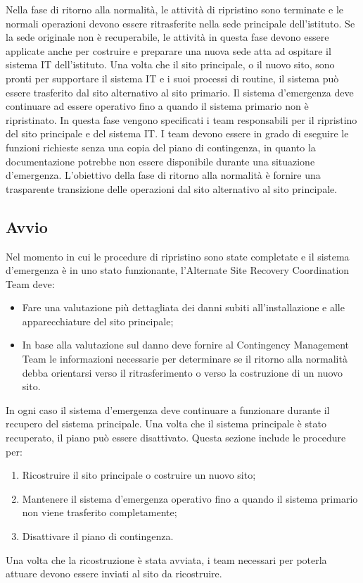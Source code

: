 \documentclass[12pt, a4paper, titlepage]{report}
\begin{document}
	Nella fase di ritorno alla normalità, le attività di ripristino sono terminate e le normali operazioni devono essere ritrasferite nella sede principale dell'istituto. Se la sede originale non è recuperabile, le attività in questa fase devono essere applicate anche per costruire e preparare una nuova sede atta ad ospitare il sistema IT dell'istituto. Una volta che il sito principale, o il nuovo sito, sono pronti per supportare il sistema IT e i suoi processi di routine, il sistema può essere trasferito dal sito alternativo al sito primario. Il sistema d'emergenza deve continuare ad essere operativo fino a quando il sistema primario non è ripristinato. In questa fase vengono specificati i team responsabili per il ripristino del sito principale e del sistema IT. I team devono essere in grado di eseguire le funzioni richieste senza una copia del piano di contingenza, in quanto la documentazione potrebbe non essere disponibile durante una situazione d'emergenza. L'obiettivo della fase di ritorno alla normalità è fornire una trasparente transizione delle operazioni dal sito alternativo al sito principale.
	
	\subsection{Avvio} \label{avvio}
	
	Nel momento in cui le procedure di ripristino sono state completate e il sistema d'emergenza è in uno stato funzionante, l'Alternate Site Recovery Coordination Team deve:
	\begin{itemize}
		\item Fare una valutazione più dettagliata dei danni subiti all'installazione e alle apparecchiature del sito principale;
		\item In base alla valutazione sul danno deve fornire al Contingency Management Team le informazioni necessarie per determinare se il ritorno alla normalità debba orientarsi verso il ritrasferimento o verso la costruzione di un nuovo sito.
	\end{itemize}
	In ogni caso il sistema d'emergenza deve continuare a funzionare durante il recupero del sistema principale. Una volta che il sistema principale è stato recuperato, il piano può essere disattivato. Questa sezione include le procedure per:
	\begin{enumerate}
		\item Ricostruire il sito principale o costruire un nuovo sito;
		\item Mantenere il sistema d'emergenza operativo fino a quando il sistema primario non viene trasferito completamente;
		\item Disattivare il piano di contingenza.
	\end{enumerate}
	Una volta che la ricostruzione è stata avviata, i team necessari per poterla attuare devono essere inviati al sito da ricostruire.
	
\end{document}
